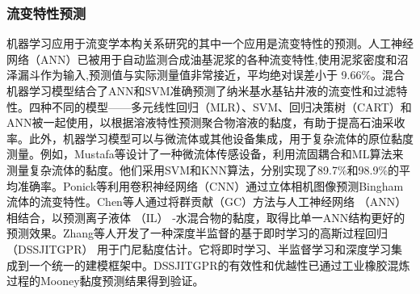 \subsubsection{流变特性预测}
机器学习应用于流变学本构关系研究的其中一个应用是流变特性的预测。人工神经网络（ANN）已被用于自动监测合成油基泥浆的各种流变特性,使用泥浆密度和沼泽漏斗作为输入,预测值与实际测量值非常接近，平均绝对误差小于 9.66\%\cite{alsabaaMachineLearningModel2022}。混合机器学习模型结合了ANN和SVM准确预测了纳米基水基钻井液的流变性和过滤特性。四种不同的模型——多元线性回归（MLR）、SVM、回归决策树（CART）和ANN被一起使用，以根据溶液特性预测聚合物溶液的黏度，有助于提高石油采收率\cite{shakeel2023application}。此外，机器学习模型可以与微流体或其他设备集成，用于复杂流体的原位黏度测量。例如，Mustafa等设计了一种微流体传感设备，利用流固耦合和ML算法来测量复杂流体的黏度\cite{mustafaMachineLearningBased2023}。他们采用SVM和KNN算法，分别实现了89.7\%和98.9\%的平均准确率。Ponick等利用卷积神经网络（CNN）通过立体相机图像预测Bingham流体的流变特性\cite{Ponick2022}。Chen等人通过将群贡献（GC）方法与人工神经网络 （ANN） 相结合，以预测离子液体 （IL） -水混合物的黏度\cite{CHEN2022118546}，取得比单一ANN结构更好的预测效果。Zhang等人开发了一种深度半监督的基于即时学习的高斯过程回归 （DSSJITGPR） 用于门尼黏度估计\cite{polym14051018}。它将即时学习、半监督学习和深度学习集成到一个统一的建模框架中。DSSJITGPR的有效性和优越性已通过工业橡胶混炼过程的Mooney黏度预测结果得到验证。

